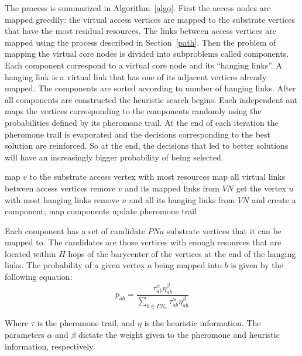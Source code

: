 \documentclass[11pt, a4paper]{article}
\begin{document}
The process is summarized in Algorithm~\ref{algo}. First the access nodes are mapped greedily: the virtual access vertices are mapped to the substrate vertices that have the most residual resources. The links between access vertices are mapped using the process described in Section~\ref{path}. Then the problem of mapping the virtual core nodes is divided into subproblems called components. Each component correspond to a virtual core node and its ``hanging links''. A hanging link is a virtual link that has one of its adjacent vertices already mapped. The components are sorted according to number of hanging links. After all components are constructed the heuristic search begins. Each independent ant maps the vertices corresponding to the components randomly using the probabilities defined by its pheromone trail. At the end of each iteration the pheromone trail is evaporated and the decisions corresponding to the best solution are reinforced. So at the end, the decisions that led to better solutions will have an increasingly bigger probability of being selected.

\begin{algorithm}
  {map $v$ to the substrate access vertex with most resources\;
   map all virtual links between access vertices\;
   remove $v$ and its mapped links from $VN$}
  {get the vertex $u$ with most hanging links\;
   remove $u$ and all its hanging links from $VN$ and create a component;
  }
  {
    {map components\;}
    update pheromone trail\;
  }
\caption{ACO for the network embedding problem}
\label{algo}
\end{algorithm}

Each component has a set of candidate $PNa$ substrate vertices that it can be mapped to. The candidates are those vertices with enough resources that are located within $H$ hops of the barycenter of the vertices at the end of the hanging links. The probability of a given vertex $a$ being mapped into $b$ is given by the following equation:
\begin{equation}
  p_{ab} = \frac{\tau^{\alpha}_{ab} \eta^{\beta}_{ab}}
  {\sum_{b \in PN_{a}} \tau^{\alpha}_{ab} \eta^{\beta}_{ab}}
\end{equation}

Where $\tau$ is the pheromone trail, and $\eta$ is the heuristic information. The parameters $\alpha$ and $\beta$ dictate the weight given to the pheromone and heuristic information, respectively. 
\end{document}
